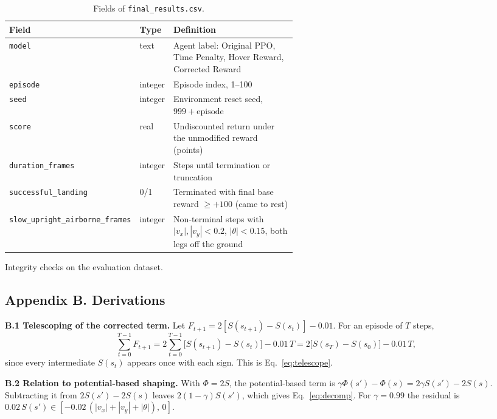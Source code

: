 \documentclass[11pt,a4paper]{article}
\begin{document}
\begin{table}[H]
\caption[Fields of the evaluation dataset]{Fields of \texttt{final\_results.csv}.}\label{tab:dict}
\centering\small
\begin{tabular}{@{}llp{0.55\linewidth}@{}}
\toprule
Field & Type & Definition \\
\midrule
\texttt{model} & text & Agent label: Original PPO, Time Penalty, Hover Reward, Corrected Reward \\
\texttt{episode} & integer & Episode index, 1--100 \\
\texttt{seed} & integer & Environment reset seed, $999+\text{episode}$ \\
\texttt{score} & real & Undiscounted return under the unmodified reward (points) \\
\texttt{duration\_frames} & integer & Steps until termination or truncation \\
\texttt{successful\_landing} & 0/1 & Terminated with final base reward $\geq+100$ (came to rest) \\
\texttt{slow\_upright\_airborne\_frames} & integer & Non-terminal steps with $|v_x|,|v_y|<0.2$, $|\theta|<0.15$, both legs off the ground \\
\bottomrule
\end{tabular}
\end{table}

\begin{table}[H]
\caption[Dataset integrity checks]{Integrity checks on the evaluation dataset.}\label{tab:integrity}
\centering\small

\end{table}

\subsection*{Appendix B. Derivations}

\textbf{B.1 Telescoping of the corrected term.} Let $F_{t+1} = 2[S(s_{t+1})-S(s_t)] - 0.01$. For an episode of $T$ steps,
\[
\sum_{t=0}^{T-1}F_{t+1} = 2\sum_{t=0}^{T-1}\big[S(s_{t+1})-S(s_t)\big] - 0.01\,T = 2\big[S(s_T)-S(s_0)\big] - 0.01\,T,
\]
since every intermediate $S(s_t)$ appears once with each sign. This is Eq.~\eqref{eq:telescope}.

\textbf{B.2 Relation to potential-based shaping.} With $\Phi=2S$, the potential-based term is $\gamma\Phi(s')-\Phi(s) = 2\gamma S(s') - 2S(s)$. Subtracting it from $2S(s')-2S(s)$ leaves $2(1-\gamma)S(s')$, which gives Eq.~\eqref{eq:decomp}. For $\gamma=0.99$ the residual is $0.02\,S(s')\in[-0.02\,(|v_x|+|v_y|+|\theta|),\,0]$.
\end{document}
